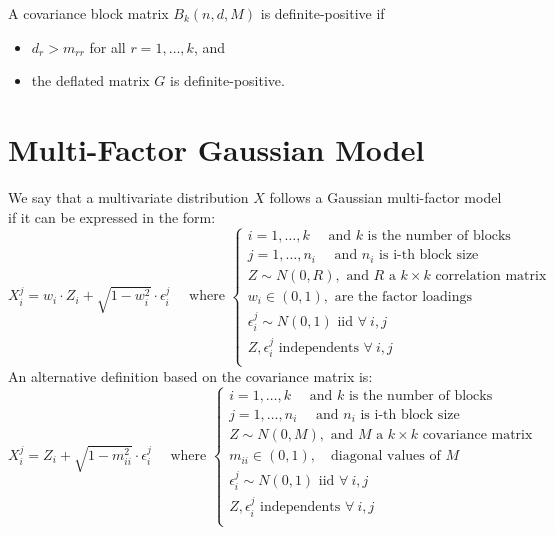 \documentclass[11pt,fleqn]{book} %
\begin{document}
\begin{corollary}
	A covariance block matrix $B_k(n,d,M)$ is definite-positive if
	\begin{itemize}
		\item $d_r > m_{rr}$ for all $r=1,\dots,k$, and
		\item the deflated matrix $G$ is definite-positive.
	\end{itemize}
\end{corollary}

\section{Multi-Factor Gaussian Model}
\label{ap:mfgm}

\begin{definition}
	\label{def:gmfm}
	We say that a multivariate distribution $X$ follows a Gaussian multi-factor
	model if it can be expressed in the form:
	\begin{displaymath}
		X_i^j = w_i \cdot Z_i + \sqrt{1-w_i^2} \cdot \epsilon_i^j
		\quad \text{ where } \left\{
		\begin{array}{l}
			i = 1, \dots, k \quad \text{ and $k$ is the number of blocks}    \\
			j = 1, \dots, n_i \quad \text{ and $n_i$ is i-th block size}     \\
			Z \sim N(0,R), \text{ and $R$ a $k {\times} k$ correlation matrix} \\
			w_i \in (0,1), \text{ are the factor loadings }                  \\
			\epsilon_i^j \sim N(0,1) \text { iid } \forall\ i,j               \\
			Z, \epsilon_i^j \text{ independents } \forall\ i,j                \\
		\end{array}
		\right.
	\end{displaymath}
	An alternative definition based on the covariance matrix is:
	\begin{displaymath}
		X_i^j = Z_i + \sqrt{1-m_{ii}^2} \cdot \epsilon_i^j
		\quad \text{ where } \left\{
		\begin{array}{l}
			i = 1, \dots, k \quad \text{ and $k$ is the number of blocks}    \\
			j = 1, \dots, n_i \quad \text{ and $n_i$ is i-th block size}     \\
			Z \sim N(0,M), \text{ and $M$ a $k {\times} k$ covariance matrix} \\
			m_{ii} \in (0,1), \quad \text{diagonal values of $M$}            \\
			\epsilon_i^j \sim N(0,1) \text { iid } \forall\ i,j               \\
			Z, \epsilon_i^j \text{ independents } \forall\ i,j                \\
		\end{array}
		\right.
	\end{displaymath}
\end{definition}
\end{document}
